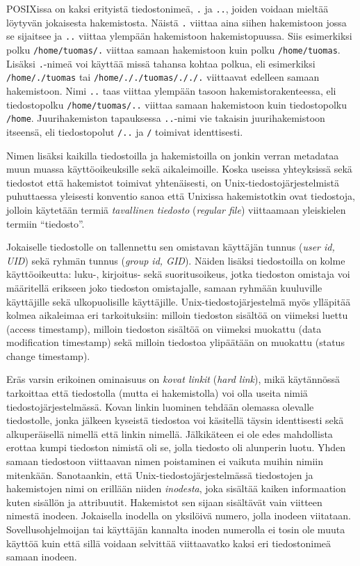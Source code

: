 POSIXissa on kaksi erityistä tiedostonimeä, \texttt{.} ja \texttt{..}, joiden voidaan mieltää löytyvän jokaisesta hakemistosta.
Näistä \texttt{.} viittaa aina siihen hakemistoon jossa se sijaitsee ja \texttt{..} viittaa ylempään hakemistoon hakemistopuussa.
Siis esimerkiksi polku \texttt{/home/tuomas/.} viittaa samaan hakemistoon kuin polku \texttt{/home/tuomas}.
Lisäksi \texttt{.}-nimeä voi käyttää missä tahansa kohtaa polkua,
eli esimerkiksi \texttt{/home/./tuomas} tai \texttt{/home/././tuomas/././.} viittaavat edelleen samaan hakemistoon.
Nimi \texttt{..} taas viittaa ylempään tasoon hakemistorakenteessa,
eli tiedostopolku \texttt{/home/tuomas/..} viittaa samaan hakemistoon kuin tiedostopolku \texttt{/home}.
Juurihakemiston tapauksessa \texttt{..}-nimi vie takaisin juurihakemistoon itseensä, eli tiedostopolut \texttt{/..} ja \texttt{/} toimivat identtisesti.

Nimen lisäksi kaikilla tiedostoilla ja hakemistoilla on jonkin verran metadataa muun muassa käyttöoikeuksille sekä aikaleimoille.
Koska useissa yhteyksissä sekä tiedostot että hakemistot toimivat yhtenäisesti,
on Unix-tiedostojärjestelmistä puhuttaessa yleisesti konventio sanoa että Unixissa hakemistotkin ovat tiedostoja,
jolloin käytetään termiä \emph{tavallinen tiedosto} (\emph{regular file}) viittaamaan yleiskielen termiin ``tiedosto''.

Jokaiselle tiedostolle on tallennettu sen omistavan käyttäjän tunnus (\emph{user id, UID}) sekä ryhmän tunnus (\emph{group id, GID}).
Näiden lisäksi tiedostoilla on kolme käyttöoikeutta: luku-, kirjoitus- sekä suoritusoikeus,
jotka tiedoston omistaja voi määritellä erikseen joko tiedoston omistajalle, samaan ryhmään kuuluville käyttäjille sekä ulkopuolisille käyttäjille.
Unix-tiedostojärjestelmä myös ylläpitää kolmea aikaleimaa eri tarkoituksiin:
milloin tiedoston sisältöä on viimeksi luettu (access timestamp), milloin tiedoston sisältöä on viimeksi muokattu (data modification timestamp) sekä milloin tiedostoa ylipäätään on muokattu (status change timestamp).

Eräs varsin erikoinen ominaisuus on \emph{kovat linkit} (\emph{hard link}), mikä käytännössä tarkoittaa että tiedostolla (mutta ei hakemistolla) voi olla useita nimiä tiedostojärjestelmässä.
Kovan linkin luominen tehdään olemassa olevalle tiedostolle,
jonka jälkeen kyseistä tiedostoa voi käsitellä täysin identtisesti sekä alkuperäisellä nimellä että linkin nimellä.
Jälkikäteen ei ole edes mahdollista erottaa kumpi tiedoston nimistä oli se,
jolla tiedosto oli alunperin luotu.
Yhden samaan tiedostoon viittaavan nimen poistaminen ei vaikuta muihin nimiin mitenkään.
Sanotaankin, että Unix-tiedostojärjestelmässä tiedostojen ja hakemistojen nimi on erillään niiden \emph{inodesta},
joka sisältää kaiken informaation kuten sisällön ja attribuutit.
Hakemistot sen sijaan sisältävät vain viitteen nimestä inodeen.
Jokaisella inodella on yksilöivä numero,
jolla inodeen viitataan.
Sovellusohjelmoijan tai käyttäjän kannalta inoden numerolla ei tosin ole muuta käyttöä kuin että sillä voidaan selvittää viittaavatko kaksi eri tiedostonimeä samaan inodeen.

